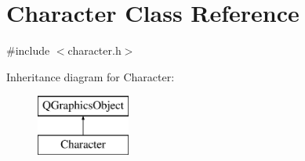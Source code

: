 \hypertarget{class_character}{\section{Character Class Reference}
\label{class_character}
}


{\ttfamily \#include $<$character.\-h$>$}

Inheritance diagram for Character\-:\begin{figure}[H]
\begin{center}
\leavevmode
\includegraphics[height=2.000000cm]{class_character}
\end{center}
\end{figure}
